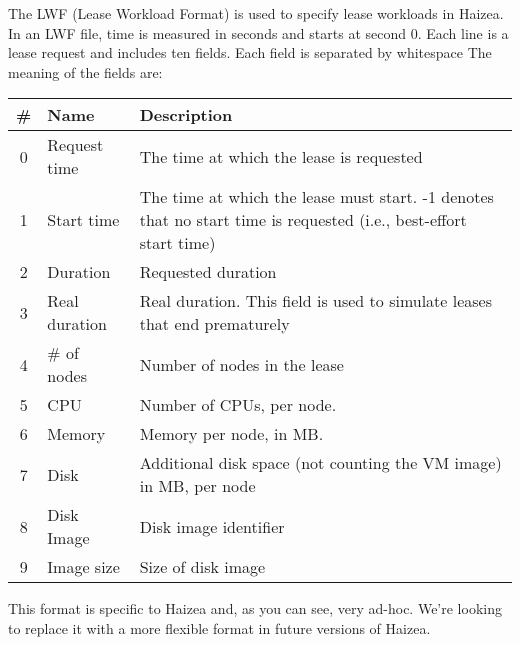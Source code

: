 The LWF (Lease Workload Format) is used to specify lease workloads in Haizea.  In an LWF file, time is measured in seconds and starts at second 0. Each line is a lease request and includes ten fields. Each field is separated by whitespace 
The meaning of the fields are:

\begin{center}
\begin{tabular}{|c|l|p{6cm}|}
\hline
\sffamily\bfseries \# & \sffamily\bfseries Name & \sffamily\bfseries Description \\ \hline\hline
  0 & Request time  & The time at which the lease is requested \\ \hline
  1 & Start time    & The time at which the lease must start. -1 denotes that no start time is requested (i.e., best-effort start time) \\ \hline
  2 & Duration      & Requested duration \\ \hline
  3 & Real duration & Real duration. This field is used to simulate leases that end prematurely \\ \hline
  4 & \# of nodes   & Number of nodes in the lease \\ \hline
  5 & CPU           & Number of CPUs, per node. \\ \hline
  6 & Memory        & Memory per node, in MB. \\ \hline
  7 & Disk          & Additional disk space (not counting the VM image) in MB, per node \\ \hline
  8 & Disk Image    & Disk image identifier \\ \hline
  9 & Image size    & Size of disk image \\ \hline
\end{tabular}
\end{center}

This format is specific to Haizea and, as you can see, very ad-hoc. We're looking to replace it with a more flexible format in future versions of Haizea.